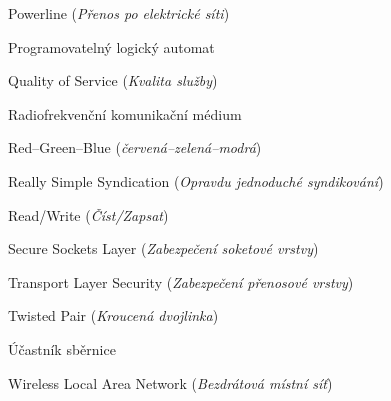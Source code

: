 \begin{acronym}[KolikMista]
	{Powerline (\textit{Přenos po elektrické síti})}

	{Programovatelný logický automat}

	{Quality of Service (\textit{Kvalita služby})}

	{Radiofrekvenční komunikační médium}

	{Red–Green–Blue (\textit{červená–zelená–modrá})}

	{Really Simple Syndication (\textit{Opravdu jednoduché syndikování})}

	{Read/Write (\textit{Číst/Zapsat})}

	{Secure Sockets Layer (\textit{Zabezpečení soketové vrstvy})}

	{Transport Layer Security (\textit{Zabezpečení přenosové vrstvy})}

	{Twisted Pair (\textit{Kroucená dvojlinka})}

	{Účastník sběrnice}

	{Wireless Local Area Network (\textit{Bezdrátová místní síť})}
\end{acronym}

